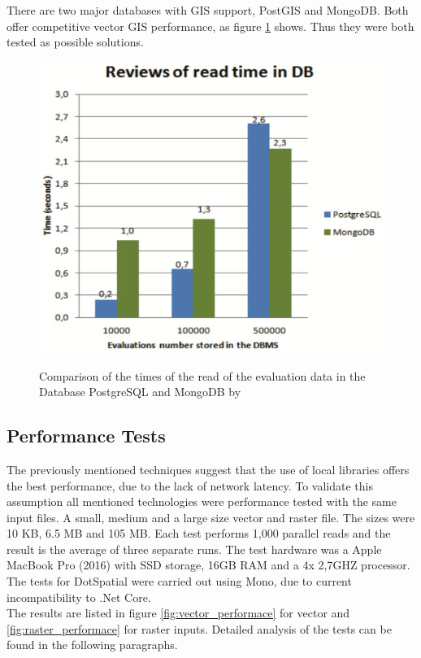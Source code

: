 There are two major databases with GIS support, PostGIS and MongoDB. Both offer competitive vector GIS performance, as figure \ref{img:mongo-vs-postgres} shows. Thus they were both tested as possible solutions.

\begin{figure}[H]
	\centering
	\includegraphics[width=0.6\columnwidth]{res/mongo-vs-postgres}\\
	\caption[]{Comparison of the times of the read of the evaluation data in the Database PostgreSQL and MongoDB by \cite{Maia2016}}
	\label{img:mongo-vs-postgres}
\end{figure}


\subsection{Performance Tests}
The previously mentioned techniques suggest that the use of local libraries offers the best performance, due to the lack of network latency. To validate this assumption all mentioned technologies were performance tested with the same input files. A small, medium and a large size vector and raster file. The sizes were 10 KB, 6.5 MB and 105 MB. Each test performs 1,000 parallel reads and the result is the average of three separate runs. The test hardware was a Apple MacBook Pro (2016) with SSD storage, 16GB RAM and a 4x 2,7GHZ processor. The tests for DotSpatial were carried out using Mono, due to current incompatibility to .Net Core.\\
The results are listed in figure \ref{fig:vector_performace} for vector and \ref{fig:raster_performace} for raster inputs. Detailed analysis of the tests can be found in the following paragraphs.

